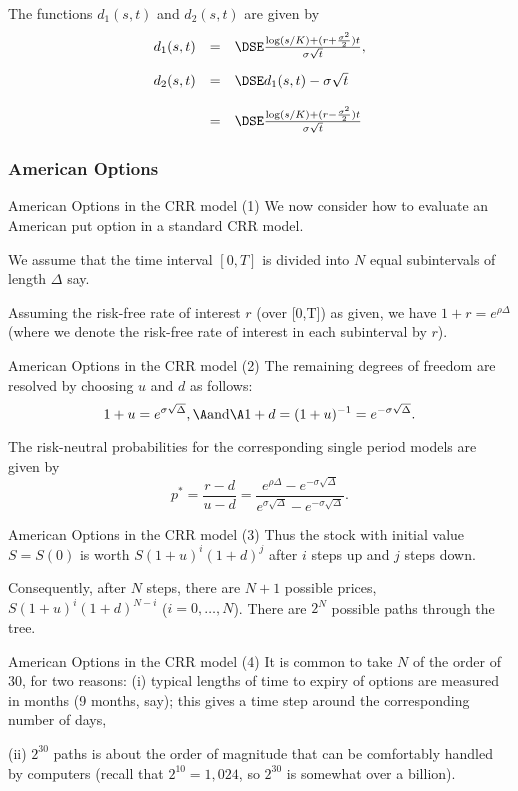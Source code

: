 	The functions $d_1(s,t)$ and $d_2(s,t)$ are given by
		$$
		\begin{array}{lll}
		d_1(s,t) &=&\DSE \frac{\log(s/K) + (r +
		\frac{\sigma^2}{2})t}{\sigma \sqrt{t}},\\*[12pt] d_2(s,t) &=&\DSE
		d_1(s,t) -\sigma \sqrt{t}\\*[12pt]
		&=&\DSE \frac{\log(s/K) + (r -
		\frac{\sigma^2}{2})t}{\sigma \sqrt{t}}
		\end{array}
		$$


\subsubsection{American Options}

American Options in the CRR model (1)
	We now consider how to evaluate an American put option in a
	standard CRR model.
	
	We assume that the time interval $[0,T]$ is
	divided into $N$ equal subintervals of length $\Delta $ say.
	 
	Assuming the risk-free rate of interest $r$ (over [0,T]) as given,
	we have $1+r = e^{\rho \Delta}$ (where we denote the risk-free
	rate of interest in each subinterval by $r$).


American Options in the CRR model (2)
	The remaining degrees of freedom are resolved by choosing $u$ and $d$ as follows:
		$$
		1+u= e^{\sigma \sqrt{\Delta}}, \A \mbox{and} \A 1+d = (1+u)^{-1} =
		e^{-\sigma \sqrt{\Delta}}.
		$$

	The risk-neutral probabilities for the corresponding single period models are given by
		$$
		p^*= \frac{r-d}{u-d} = \frac{e^{\rho \Delta}-e^{-\sigma
		\sqrt{\Delta}}} {e^{\sigma \sqrt{\Delta}}-e^{-\sigma
		\sqrt{\Delta}}}.
		$$


American Options in the CRR model (3)
	Thus the stock with initial value $S = S(0)$ is worth $S (1+u)^i
	(1+d)^j$ after $i$ steps up and $j$ steps down.
	
	Consequently, after $N$ steps, there are $N+1$ possible prices, $S (1+u)^i
	(1+d)^{N-i}$ ($i = 0, \ldots, N$). There are $2^N$ possible paths
	through the tree.


American Options in the CRR model (4)
	It is common to take $N$ of the order of 30, for two reasons:
		(i) typical lengths of time to expiry of
		options are measured in months (9 months, say); this
		gives a time step around the corresponding number of days,
 
		(ii) $2^{30}$ paths is about the order of magnitude that can be
		comfortably handled by computers (recall that $2^{10} = 1,024$, so
		$2^{30}$ is somewhat over a billion).


